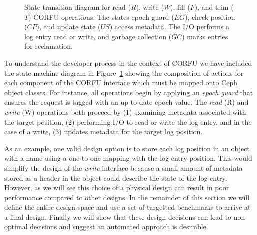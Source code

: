 \documentclass[10pt,twocolumn]{article}
\begin{document}
\begin{figure}[t]
\centering
{}
\caption{State transition diagram for read ($R$), write ($W$), fill ($F$), and
trim ($T$) CORFU operations. The states epoch guard ($EG$), check position ($CP$),
and update state ($US$) access metadata. The I/O performs a log entry read or
write, and garbage collection ($GC$) marks entries for reclamation.}
\label{fig:corfu-sm}
\end{figure}

To understand the developer process in the context of CORFU we have included the
state-machine diagram in Figure~\ref{fig:corfu-sm} showing the composition of
actions for each component of the CORFU interface which must be mapped onto
Ceph object classes. For instance, all operations begin by applying an
\emph{epoch guard} that ensures the request is tagged with an up-to-date epoch
value. The \emph{read} (R) and \emph{write} (W) operations both proceed by (1)
examining metadata associated with the target position, (2) performing I/O to
read or write the log entry, and in the case of a write, (3) updates metadata
for the target log position.

As an example, one valid design option is to store each log position in an
object with a name using a one-to-one mapping with the log entry position.
This would simplify the design of the \emph{write} interface because a small
amount of metadata stored as a header in the object could describe the state
of the log entry.  However, as we will see this choice of a physical design
can result in poor performance compared to other designs. In the remainder of
this section we will define the entire design space and use a set of targetted
benchmarks to arrive at a final design. Finally we will show that these design
decisions can lead to non-optimal decisions and suggest an automated approach
is desirable.
\end{document}
